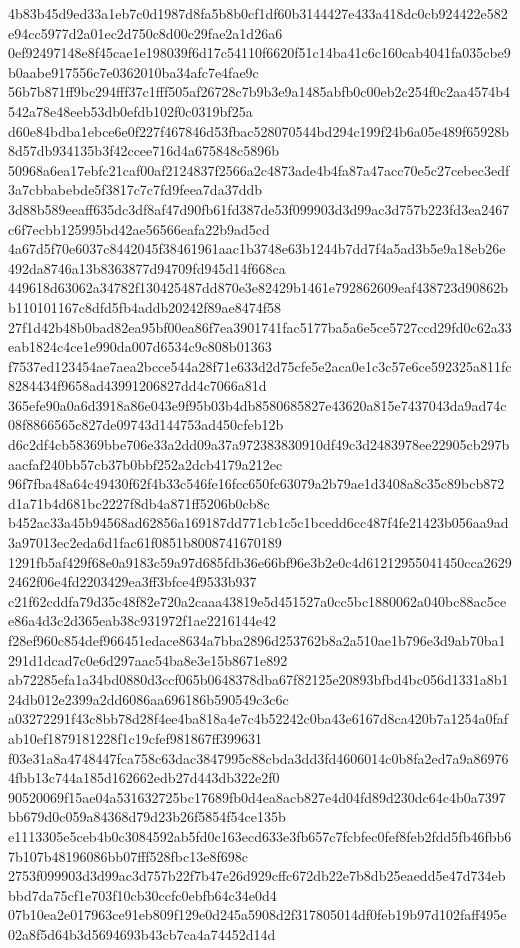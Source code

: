 \documentclass[11pt,a4paper]{article}
\begin{document}
{4b83b45d9ed33a1eb7c0d1987d8fa5b8b0cf1df60b3144427e433a418dc0cb924422e582e94cc5977d2a01ec2d750c8d00c29fae2a1d26a6
0ef92497148e8f45cae1e198039f6d17c54110f6620f51c14ba41c6c160cab4041fa035cbe9b0aabe917556c7e0362010ba34afc7e4fae9c
56b7b871ff9bc294fff37c1fff505af26728c7b9b3e9a1485abfb0c00eb2c254f0c2aa4574b4542a78e48eeb53db0efdb102f0c0319bf25a
d60e84bdba1ebce6e0f227f467846d53fbac528070544bd294c199f24b6a05e489f65928b8d57db934135b3f42ccee716d4a675848c5896b
50968a6ea17ebfc21caf00af2124837f2566a2c4873ade4b4fa87a47acc70e5c27cebec3edf3a7cbbabebde5f3817c7c7fd9feea7da37ddb
3d88b589eeaff635dc3df8af47d90fb61fd387de53f099903d3d99ac3d757b223fd3ea2467c6f7ecbb125995bd42ae56566eafa22b9ad5cd
4a67d5f70e6037c8442045f38461961aac1b3748e63b1244b7dd7f4a5ad3b5e9a18eb26e492da8746a13b8363877d94709fd945d14f668ca
449618d63062a34782f130425487dd870e3e82429b1461e792862609eaf438723d90862bb110101167c8dfd5fb4addb20242f89ae8474f58
27f1d42b48b0bad82ea95bf00ea86f7ea3901741fac5177ba5a6e5ce5727ccd29fd0c62a33eab1824c4ce1e990da007d6534c9c808b01363
f7537ed123454ae7aea2bcce544a28f71e633d2d75cfe5e2aca0e1c3c57e6ce592325a811fc8284434f9658ad43991206827dd4c7066a81d
365efe90a0a6d3918a86e043e9f95b03b4db8580685827e43620a815e7437043da9ad74c08f8866565c827de09743d144753ad450cfeb12b
d6c2df4cb58369bbe706e33a2dd09a37a972383830910df49c3d2483978ee22905cb297baacfaf240bb57cb37b0bbf252a2dcb4179a212ec
96f7fba48a64c49430f62f4b33c546fe16fcc650fc63079a2b79ae1d3408a8c35c89bcb872d1a71b4d681bc2227f8db4a871ff5206b0cb8c
b452ac33a45b94568ad62856a169187dd771cb1c5c1bcedd6cc487f4fe21423b056aa9ad3a97013ec2eda6d1fac61f0851b8008741670189
1291fb5af429f68e0a9183c59a97d685fdb36e66bf96e3b2e0c4d61212955041450cca26292462f06e4fd2203429ea3ff3bfce4f9533b937
c21f62cddfa79d35c48f82e720a2caaa43819e5d451527a0cc5bc1880062a040bc88ac5cee86a4d3c2d365eab38c931972f1ae2216144e42
f28ef960c854def966451edace8634a7bba2896d253762b8a2a510ae1b796e3d9ab70ba1291d1dcad7c0e6d297aac54ba8e3e15b8671e892
ab72285efa1a34bd0880d3ccf065b0648378dba67f82125e20893bfbd4bc056d1331a8b124db012e2399a2dd6086aa696186b590549c3c6c
a03272291f43c8bb78d28f4ee4ba818a4e7c4b52242c0ba43e6167d8ca420b7a1254a0fafab10ef1879181228f1c19cfef981867ff399631
f03e31a8a4748447fca758c63dac3847995c88cbda3dd3fd4606014c0b8fa2ed7a9a869764fbb13c744a185d162662edb27d443db322e2f0
90520069f15ae04a531632725bc17689fb0d4ea8acb827e4d04fd89d230dc64c4b0a7397bb679d0c059a84368d79d23b26f5854f54ce135b
e1113305e5ceb4b0c3084592ab5fd0c163ecd633e3fb657c7fcbfec0fef8feb2fdd5fb46fbb67b107b48196086bb07fff528fbc13e8f698c
2753f099903d3d99ac3d757b22f7b47e26d929cffc672db22e7b8db25eaedd5e47d734ebbbd7da75cf1e703f10cb30ccfc0ebfb64c34e0d4
07b10ea2e017963ce91eb809f129e0d245a5908d2f317805014df0feb19b97d102faff495e02a8f5d64b3d5694693b43cb7ca4a74452d14d
}
\end{document}
